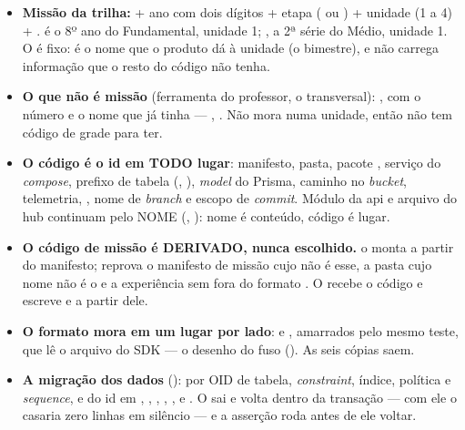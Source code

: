 \begin{itemize}
  \item \textbf{Missão da trilha:}  + ano com dois dígitos + etapa
    ( ou ) + unidade (1 a 4) + .  é o 8º ano
    do Fundamental, unidade 1; , a 2ª série do Médio, unidade 1.
    O  é fixo: é o nome que o produto dá à unidade (o bimestre), e não
    carrega informação que o resto do código não tenha.
  \item \textbf{O que não é missão} (ferramenta do professor, o transversal):
    , com o número e o nome que já tinha --- ,
    . Não mora numa unidade, então não tem código de
    grade para ter.
  \item \textbf{O código é o id em TODO lugar}: manifesto, pasta, pacote
    , serviço do \emph{compose}, prefixo de tabela (,
    ), \emph{model} do Prisma, caminho no \emph{bucket},
    telemetria, , nome de \emph{branch} e escopo de
    \emph{commit}. Módulo da api e arquivo do hub continuam pelo NOME
    (, ): nome é
    conteúdo, código é lugar.
  \item \textbf{O código de missão é DERIVADO, nunca escolhido.}
     o monta a partir do manifesto;
     reprova o manifesto de
    missão cujo  não é esse, a pasta cujo nome não é o  e a
    experiência sem  fora do formato . O 
    recebe o código e escreve  e  a partir dele.
  \item \textbf{O formato mora em um lugar por lado}:
     e
    , amarrados pelo mesmo teste,
    que lê o arquivo do SDK --- o desenho do fuso (). As seis cópias
    saem.
  \item \textbf{A migração dos dados}
    ():  por OID de
    tabela, \emph{constraint}, índice, política e \emph{sequence}, e
     do id em , ,
    , , ,
     e . O  sai e volta dentro da transação --- com ele o  casaria
    zero linhas em silêncio --- e a asserção roda antes de ele voltar.
\end{itemize}

